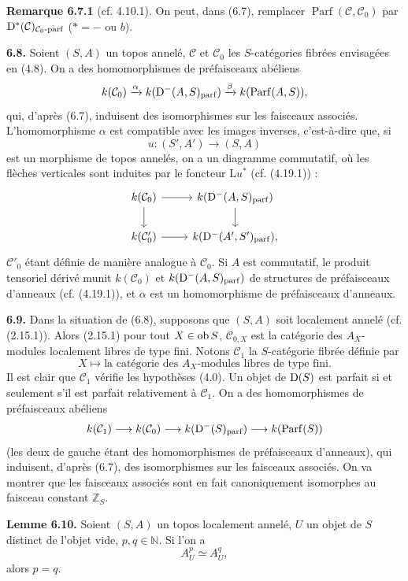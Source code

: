 \documentclass[11pt]{article}
\newcommand{\Parf}{\operatorname{Parf}}
\begin{document}
\textbf{Remarque 6.7.1} (cf. 4.10.1). On peut, dans (6.7), remplacer \(\Parf(\mathcal C,\mathcal C_0)\) par \(\mathrm D^*(\mathcal C)_{\mathcal C_0\text{-}\mathrm{parf}}\) (\(*=-\) ou \(b\)).

\textbf{6.8.} Soient \((S,A)\) un topos annelé, \(\mathcal C\) et \(\mathcal C_0\) les \(S\)-catégories fibrées envisagées en (4.8). On a des homomorphismes de préfaisceaux abéliens
\[
  k(\mathcal C_0)
  \xrightarrow{\alpha}
  k(\Dpx^-(A,S)_{\mathrm{parf}})
  \xrightarrow{\beta}
  k(\Parf(A,S)),
\]
qui, d'après (6.7), induisent des isomorphismes sur les faisceaux associés. L'homomorphisme \(\alpha\) est compatible avec les images inverses, c'est-à-dire que, si
\[
  u:(S',A')\longrightarrow(S,A)
\]
est un morphisme de topos annelés, on a un diagramme commutatif, où les flèches verticales sont induites par le foncteur \(\mathrm L u^*\) (cf. (4.19.1)) :
\[
\begin{tikzcd}
 k(\mathcal C_0) \arrow[r] \arrow[d] & k(\Dpx^-(A,S)_{\mathrm{parf}}) \arrow[d]\\
 k(\mathcal C'_0) \arrow[r] & k(\Dpx^-(A',S')_{\mathrm{parf}}),
\end{tikzcd}
\]
\(\mathcal C'_0\) étant définie de manière analogue à \(\mathcal C_0\). Si \(A\) est commutatif, le produit tensoriel dérivé munit \(k(\mathcal C_0)\) et \(k(\mathrm D^-(A,S)_{\mathrm{parf}})\) de structures de préfaisceaux d'anneaux (cf. (4.19.1)), et \(\alpha\) est un homomorphisme de préfaisceaux d'anneaux.

\textbf{6.9.} Dans la situation de (6.8), supposons que \((S,A)\) soit localement annelé (cf. (2.15.1)). Alors (2.15.1) pour tout \(X\in\operatorname{ob} S\), \(\mathcal C_{0,X}\) est la catégorie des \(A_X\)-modules localement libres de type fini. Notons \(\mathcal C_1\) la \(S\)-catégorie fibrée définie par
\[
  X\longmapsto\text{la catégorie des } A_X\text{-modules libres de type fini}.
\]
Il est clair que \(\mathcal C_1\) vérifie les hypothèses (4.0). Un objet de \(\mathrm D(S)\) est parfait si et seulement s'il est parfait relativement à \(\mathcal C_1\). On a des homomorphismes de préfaisceaux abéliens
\[
  k(\mathcal C_1)\longrightarrow k(\mathcal C_0)\longrightarrow
  k(\Dpx^-(S)_{\mathrm{parf}})\longrightarrow k(\Parf(S))
\]
(les deux de gauche étant des homomorphismes de préfaisceaux d'anneaux), qui induisent, d'après (6.7), des isomorphismes sur les faisceaux associés. On va montrer que les faisceaux associés sont en fait canoniquement isomorphes au faisceau constant \(\mathbb Z_S\).

\textbf{Lemme 6.10.} Soient \((S,A)\) un topos localement annelé, \(U\) un objet de \(S\) distinct de l'objet vide, \(p,q\in\mathbb N\). Si l'on a
\[
  A_U^p\simeq A_U^q,
\]
alors \(p=q\).
\end{document}
